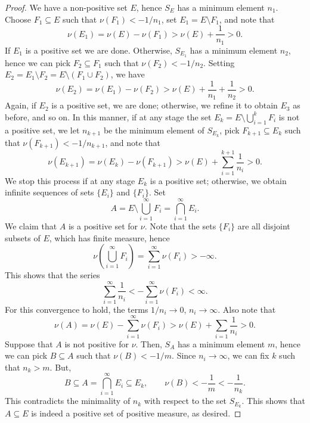 \documentclass[11pt]{article}
\theoremstyle{definition}
\theoremstyle{remark}
\begin{document}
\begin{proof}
        We have a non-positive set $E$, hence $S_E$ has a minimum element $n_1$.
        Choose $F_1 \subseteq E$ such that $\nu(F_1) < -1 / n_1$, set $E_1 =
        E\setminus F_1$, and note that \[
            \nu(E_1) = \nu(E) - \nu(F_1) > \nu(E) + \frac{1}{n_1} > 0.
        \] If $E_1$ is a positive set we are done. Otherwise, $S_{E_1}$ has a minimum
        element $n_2$, hence we can pick $F_2 \subseteq F_1$ such that $\nu(F_2) < -1
        / n_2$. Setting $E_2 = E_1\setminus F_2 = E\setminus(F_1 \cup F_2)$, we have
        \[
            \nu(E_2) = \nu(E_1) - \nu(F_2) > \nu(E) + \frac{1}{n_1} + \frac{1}{n_2} >
            0.
        \] Again, if $E_2$ is a positive set, we are done; otherwise, we refine it to
        obtain $E_3$ as before, and so on. In this manner, if at any stage the set
        $E_k = E\setminus \bigcup_{i = 1}^k F_i$ is not a positive set, we let $n_{k
        + 1}$ be the minimum element of $S_{E_k}$, pick $F_{k + 1} \subseteq E_k$
        such that $\nu(F_{k + 1}) < -1 / n_{k + 1}$, and note that \[
            \nu(E_{k + 1}) = \nu(E_k) - \nu(F_{k + 1}) > \nu(E) + \sum_{i = 1}^{k +
            1} \frac{1}{n_i} > 0.
        \] We stop this process if at any stage $E_k$ is a positive set; otherwise,
        we obtain infinite sequences of sets $\{E_i\}$ and $\{F_i\}$. Set \[
            A = E\setminus\bigcup_{i = 1}^\infty F_i = \bigcap_{i = 1}^\infty E_i.
        \] We claim that $A$ is a positive set for $\nu$. Note that the sets
        $\{F_i\}$ are all disjoint subsets of $E$, which has finite measure, hence \[
            \nu\left(\bigcup_{i = 1}^\infty F_i\right) = \sum_{i = 1}^\infty \nu(F_i)
            > -\infty.
        \] This shows that the series \[
            \sum_{i = 1}^\infty \frac{1}{n_i} < -\sum_{i = 1}^\infty \nu(F_i) < \infty.
        \] For this convergence to hold, the terms $1 / n_i \to 0$, $n_i \to \infty$.
        Also note that \[
            \nu(A) = \nu(E) - \sum_{i = 1}^\infty \nu(F_i) > \nu(E) + \sum_{i = 1}
            \frac{1}{n_i} > 0.
        \] Suppose that $A$ is not positive for $\nu$. Then, $S_A$ has a minimum
        element $m$, hence we can pick $B \subseteq A$ such that $\nu(B) < -1 / m$.
        Since $n_i \to \infty$, we can fix $k$ such that $n_k > m$. But, \[
            B \subseteq A = \bigcap_{i = 1}^\infty E_i \subseteq E_k, \qquad
            \nu(B) < -\frac{1}{m} < -\frac{1}{n_k}.
        \] This contradicts the minimality of $n_k$ with respect to the set
        $S_{E_k}$. This shows that $A \subseteq E$ is indeed a positive set of
        positive measure, as desired.
    \end{proof}
\end{document}
